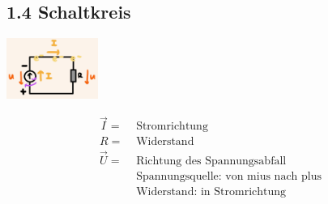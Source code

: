 \vspace{20mm}

\subsection*{1.4 Schaltkreis}
\vspace{-1mm}
\begin{minipage}{0.49\linewidth}
    \begin{footnotesize}
        \begin{center}
            \vspace{2mm}
            \includegraphics[width = 30mm]{src/images/schaltkreis.png}
        \end{center}
    \end{footnotesize}
\end{minipage}
\begin{minipage}{0.5\linewidth}
    \begin{scriptsize}
        \begin{center}
            \begin{align*}
                \overrightarrow{I} = &\text{ Stromrichtung}
                \\R = &\text{ Widerstand} 
                \\\overrightarrow{U} = &\text{ Richtung des Spannungsabfall}
                \\&\text{ Spannungsquelle: von mius nach plus}
                \\&\text{ Widerstand: in Stromrichtung}
            \end{align*}
        \end{center}
    \end{scriptsize}
\end{minipage}
\vspace{1mm}


